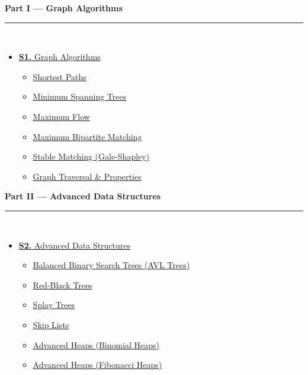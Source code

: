 \documentclass[12pt,a3paper]{article}
\begin{document}
\begin{tcolorbox}[breakable,colback=cA!5,colframe=cA,boxrule=1pt,arc=5pt,
  left=8pt,right=8pt,top=8pt,bottom=8pt,before skip=4pt]
  {\large\bfseries\textcolor{cA}{Part I --- Graph Algorithms}}\\[5pt]
  \textcolor{cA!40}{\rule{\textwidth}{0.4pt}}\\[3pt]
  \small\begin{itemize}[leftmargin=1.2em,itemsep=1pt,label={\textcolor{cA}{$\triangleright$}}]
    \item \hyperref[sec:S1]{\textbf{S1.} Graph Algorithms}
      \begin{itemize}[leftmargin=1.5em,itemsep=0pt,label={\textcolor{cA}{$\cdot$}}]
        \item \hyperref[sub:s1-shortestpaths]{Shortest Paths}
        \item \hyperref[sub:s1-mst]{Minimum Spanning Trees}
        \item \hyperref[sub:s1-maxflow]{Maximum Flow}
        \item \hyperref[sub:s1-bipartite]{Maximum Bipartite Matching}
        \item \hyperref[sub:s1-stablematching]{Stable Matching (Gale-Shapley)}
        \item \hyperref[sub:s1-traversal]{Graph Traversal \& Properties}
      \end{itemize}
  \end{itemize}
\end{tcolorbox}

\begin{tcolorbox}[breakable,colback=cB!5,colframe=cB,boxrule=1pt,arc=5pt,
  left=8pt,right=8pt,top=8pt,bottom=8pt,before skip=4pt]
  {\large\bfseries\textcolor{cB}{Part II --- Advanced Data Structures}}\\[5pt]
  \textcolor{cB!40}{\rule{\textwidth}{0.4pt}}\\[3pt]
  \small\begin{itemize}[leftmargin=1.2em,itemsep=1pt,label={\textcolor{cB}{$\triangleright$}}]
    \item \hyperref[sec:S2]{\textbf{S2.} Advanced Data Structures}
      \begin{itemize}[leftmargin=1.5em,itemsep=0pt,label={\textcolor{cB}{$\cdot$}}]
        \item \hyperref[sub:s2-avl]{Balanced Binary Search Trees (AVL Trees)}
        \item \hyperref[sub:s2-rbt]{Red-Black Trees}
        \item \hyperref[sub:s2-splay]{Splay Trees}
        \item \hyperref[sub:s2-skip]{Skip Lists}
        \item \hyperref[sub:s2-binheap]{Advanced Heaps (Binomial Heaps)}
        \item \hyperref[sub:s2-fibheap]{Advanced Heaps (Fibonacci Heaps)}
      \end{itemize}
  \end{itemize}
\end{tcolorbox}
\end{document}
